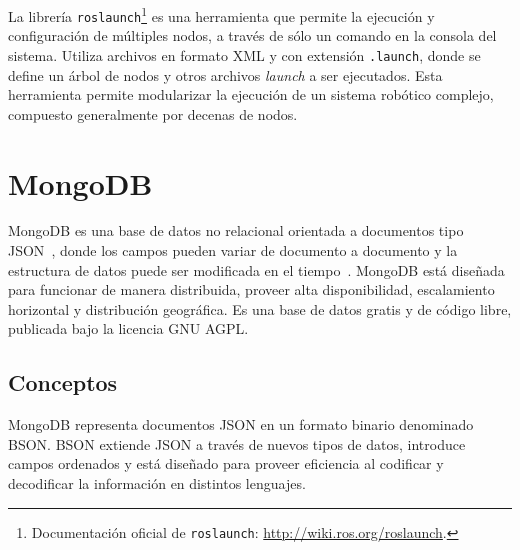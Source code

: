  La librería \texttt{roslaunch}\footnote{Documentación oficial de \texttt{roslaunch}: \url{http://wiki.ros.org/roslaunch}.} es una herramienta que permite la ejecución y configuración de múltiples nodos, a través de sólo un comando en la consola del sistema. Utiliza archivos en formato XML y con extensión \texttt{.launch}, donde se define un árbol de nodos y otros archivos \textit{launch} a ser ejecutados. Esta herramienta permite modularizar la ejecución de un sistema robótico complejo, compuesto generalmente por decenas de nodos.



\section{MongoDB}\label{sec:mongodb}

MongoDB es una base de datos no relacional orientada a documentos tipo JSON~\cite{json}, donde los campos pueden variar de documento a documento y la estructura de datos puede ser modificada en el tiempo~\cite{MongoDB}. MongoDB está diseñada para funcionar de manera distribuida, proveer alta disponibilidad, escalamiento horizontal y distribución geográfica. Es una base de datos gratis y de código libre, publicada bajo la licencia GNU AGPL.


\subsection{Conceptos}

MongoDB representa documentos JSON en un formato binario denominado BSON. BSON extiende JSON a través de nuevos tipos de datos, introduce campos ordenados y está diseñado para proveer eficiencia al codificar y decodificar la información en distintos lenguajes. 

